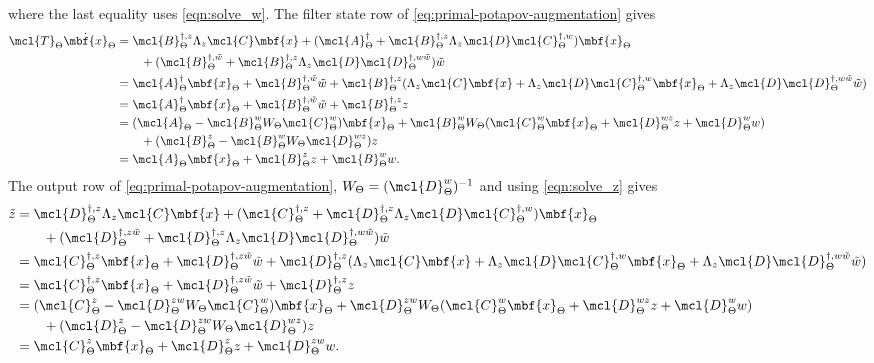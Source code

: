 where the last equality uses \eqref{eqn:solve_w}. The filter state
row of \eqref{eq:primal-potapov-augmentation} gives
\begin{align*}
\mcl{T}_{\Theta}\dot{\mbf{x}}_{\Theta}
&=\mcl{B}_{\Theta}^{\dagger,z}\Lambda_z\mcl{C}\mbf{x}
+(\mcl{A}_{\Theta}^\dagger+\mcl{B}_{\Theta}^{\dagger,z}
\Lambda_z\mcl{D}\mcl{C}_{\Theta}^{\dagger,w})\mbf{x}_{\Theta}\\
&\qquad
+(\mcl{B}_{\Theta}^{\dagger,\tilde{w}}+\mcl{B}_{\Theta}^{\dagger,z}
\Lambda_z\mcl{D}\mcl{D}_{\Theta}^{\dagger,w\tilde{w}})\tilde{w}\\
&=\mcl{A}_{\Theta}^\dagger\mbf{x}_{\Theta}
+\mcl{B}_{\Theta}^{\dagger,\tilde{w}}\tilde{w}
+\mcl{B}_{\Theta}^{\dagger,z}
(\Lambda_z\mcl{C}\mbf{x}
+\Lambda_z\mcl{D}\mcl{C}_{\Theta}^{\dagger,w}\mbf{x}_{\Theta}
+\Lambda_z\mcl{D}\mcl{D}_{\Theta}^{\dagger,w\tilde{w}}\tilde{w})\\
&=\mcl{A}_{\Theta}^\dagger\mbf{x}_{\Theta}
+\mcl{B}_{\Theta}^{\dagger,\tilde{w}}\tilde{w}
+\mcl{B}_{\Theta}^{\dagger,z} z\\
&=(\mcl{A}_{\Theta}-\mcl{B}_{\Theta}^wW_{\Theta}\mcl{C}_{\Theta}^w)\mbf{x}_{\Theta}
+\mcl{B}_{\Theta}^wW_{\Theta}
(\mcl{C}_{\Theta}^w\mbf{x}_{\Theta}+\mcl{D}_{\Theta}^{wz}z+\mcl{D}_{\Theta}^ww)\\
&\qquad
+(\mcl{B}_{\Theta}^z-\mcl{B}_{\Theta}^wW_{\Theta}\mcl{D}_{\Theta}^{wz})z\\
&=\mcl{A}_{\Theta}\mbf{x}_{\Theta}+\mcl{B}_{\Theta}^z z+\mcl{B}_{\Theta}^w w.
\end{align*}
The output row of \eqref{eq:primal-potapov-augmentation}, $W_{\Theta} = (\mcl{D}_{\Theta}^w)^{-1}$ and using \eqref{eqn:solve_z} gives
\begin{align*}
\tilde{z}
&=\mcl{D}_{\Theta}^{\dagger,z}\Lambda_z\mcl{C}\mbf{x}
+(\mcl{C}_{\Theta}^{\dagger,z}+\mcl{D}_{\Theta}^{\dagger,z}
\Lambda_z\mcl{D}\mcl{C}_{\Theta}^{\dagger,w})\mbf{x}_{\Theta}\\
&\qquad
+(\mcl{D}_{\Theta}^{\dagger,z\tilde{w}}+\mcl{D}_{\Theta}^{\dagger,z}
\Lambda_z\mcl{D}\mcl{D}_{\Theta}^{\dagger,w\tilde{w}})\tilde{w}\\
&=\mcl{C}_{\Theta}^{\dagger,z}\mbf{x}_{\Theta}
+\mcl{D}_{\Theta}^{\dagger,z\tilde{w}}\tilde{w}
+\mcl{D}_{\Theta}^{\dagger,z}
(\Lambda_z\mcl{C}\mbf{x}
+\Lambda_z\mcl{D}\mcl{C}_{\Theta}^{\dagger,w}\mbf{x}_{\Theta}
+\Lambda_z\mcl{D}\mcl{D}_{\Theta}^{\dagger,w\tilde{w}}\tilde{w})\\
&=\mcl{C}_{\Theta}^{\dagger,z}\mbf{x}_{\Theta}
+\mcl{D}_{\Theta}^{\dagger,z\tilde{w}}\tilde{w}
+\mcl{D}_{\Theta}^{\dagger,z} z\\
&=(\mcl{C}_{\Theta}^z-\mcl{D}_{\Theta}^{zw}W_{\Theta}\mcl{C}_{\Theta}^w)\mbf{x}_{\Theta}
+\mcl{D}_{\Theta}^{zw}W_{\Theta}
(\mcl{C}_{\Theta}^w\mbf{x}_{\Theta}+\mcl{D}_{\Theta}^{wz}z+\mcl{D}_{\Theta}^ww)\\
&\qquad
+(\mcl{D}_{\Theta}^z-\mcl{D}_{\Theta}^{zw}W_{\Theta}\mcl{D}_{\Theta}^{wz})z\\
&=\mcl{C}_{\Theta}^z\mbf{x}_{\Theta}+\mcl{D}_{\Theta}^z z+\mcl{D}_{\Theta}^{zw}w.
\end{align*}
